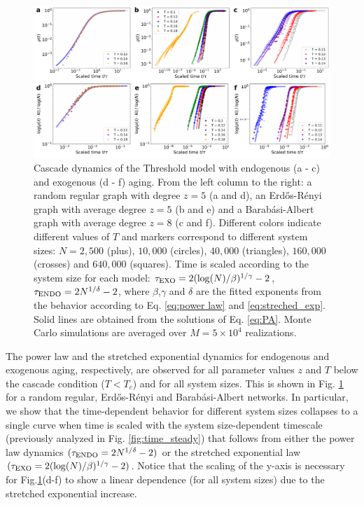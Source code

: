 \begin{figure}
\includegraphics[width=\linewidth]{Figs/Aging_Threshold/FIG_EVO_EXO_ENDO.pdf}
\caption[Cascade dynamics of the Threshold model in graphs]{\label{fig:exo_endo_evo} Cascade dynamics of the Threshold model with endogenous (a - c) and exogenous (d - f) aging. From the left column to the right: a random regular graph with degree $z=5$ (a and d), an Erd\H{o}s-R\'enyi graph with average degree $z = 5$ (b and e) and a Barab\'asi-Albert graph with average degree $z = 8$ (c and f). Different colors indicate different values of $T$ and markers correspond to different system sizes: $N = 2,500$ (plus), $10,000$ (circles), $40,000$ (triangles), $160,000$ (crosses) and $640,000$ (squares). Time is scaled according to the system size for each model: $\tau_{\rm{EXO}} = 2(\log(N)/\beta)^{1/\gamma} - 2$, $\tau_{\rm{ENDO}} = 2N^{1/\delta} - 2$, where $\beta$,$\gamma$ and $\delta$ are the fitted exponents from the behavior according to Eq. \eqref{eq:power law} and \eqref{eq:streched_exp}. Solid lines are obtained from the solutions of Eq. \eqref{eq:PA}. Monte Carlo simulations are averaged over $M = 5 \times 10^4$ realizations.}
\end{figure}

The power law and the stretched exponential dynamics for endogenous and exogenous aging, respectively, are observed for all parameter values $z$ and $T$ below the cascade condition ($T < T_c$) and for all system sizes. This is shown in Fig. \ref{fig:exo_endo_evo} for a random regular, Erd\H{o}s-R\'enyi and  Barab\'asi-Albert networks. In particular, we show that the time-dependent behavior for different system sizes collapses to a single curve when time is scaled with the system size-dependent timescale (previously analyzed in Fig. \ref{fig:time_steady}) that follows from either the power law dynamics $(\tau_{\rm{ENDO}} = 2N^{1/\delta} - 2)$  or the stretched exponential law  $(\tau_{\rm{EXO}} = 2( \log(N)/\beta )^{1/\gamma} - 2)$. Notice that the scaling of the y-axis is necessary for Fig.\ref{fig:exo_endo_evo}(d-f) to show a linear dependence (for all system sizes) due to the stretched exponential increase.

